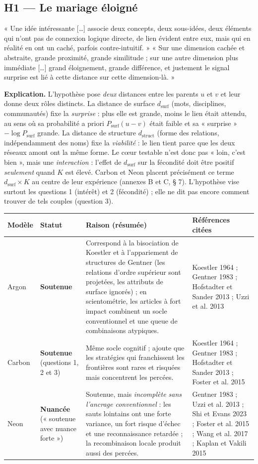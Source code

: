 \documentclass[a4paper,11pt]{article}
\makeatletter
\newenvironment{avis}{\small\renewcommand{\arraystretch}{1.15}%
\begin{longtable}{@{}>{\raggedright\arraybackslash}p{1.35cm}>{\raggedright\arraybackslash}p{2.45cm}>{\raggedright\arraybackslash}p{7.15cm}>{\raggedright\arraybackslash}p{4.4cm}@{}}
\toprule \textbf{Modèle} & \textbf{Statut} & \textbf{Raison (résumée)} & \textbf{Références citées}\\ \midrule \endhead
\bottomrule \endfoot}{\end{longtable}}
\newcommand{\st}[1]{\textbf{#1}}
\makeatother
\begin{document}
\subsection{H1 — Le mariage éloigné}
\begin{enonce}
« Une idée intéressante […] associe deux concepts, deux sous-idées, deux éléments qui n'ont pas de connexion logique directe, de lien évident entre eux, mais qui en réalité en ont un caché, parfois contre-intuitif. » « Sur une dimension cachée et abstraite, grande proximité, grande similitude ; sur une autre dimension plus immédiate […] grand éloignement, grande différence, et justement le signal surprise est lié à cette distance sur cette dimension-là. »
\end{enonce}

\textbf{Explication.} L'hypothèse pose \emph{deux} distances entre les parents $u$ et $v$ et leur donne deux rôles distincts. La distance de surface $d_{\text{surf}}$ (mots, disciplines, communautés) fixe la \emph{surprise} : plus elle est grande, moins le lien était attendu, au sens où sa probabilité a priori $P_{\text{surf}}(u\!-\!v)$ était faible et sa « surprise » $-\log P_{\text{surf}}$ grande. La distance de structure $d_{\text{struct}}$ (forme des relations, indépendamment des noms) fixe la \emph{viabilité} : le lien tient parce que les deux réseaux amont ont la même forme. Le cœur testable n'est donc pas « loin, c'est bien », mais une \emph{interaction} : l'effet de $d_{\text{surf}}$ sur la fécondité doit être positif \emph{seulement} quand $K$ est élevé. Carbon et Neon placent précisément ce terme $d_{\text{surf}}\times K$ au centre de leur expérience (annexes B et C, § 7). L'hypothèse vise surtout les questions 1 (intérêt) et 2 (fécondité) ; elle ne dit pas encore comment trouver de tels couples (question 3).

\begin{avis}
Argon & \st{Soutenue} & Correspond à la bisociation de Koestler et à l'appariement de structures de Gentner (les relations d'ordre supérieur sont projetées, les attributs de surface ignorés) ; en scientométrie, les articles à fort impact combinent un socle conventionnel et une queue de combinaisons atypiques. & Koestler 1964 ; Gentner 1983 ; Hofstadter et Sander 2013 ; Uzzi et al. 2013\\ \midrule
Carbon & \st{Soutenue} (questions 1, 2 et 3) & Même socle cognitif ; ajoute que les stratégies qui franchissent les frontières sont rares et risquées mais concentrent les percées. & Koestler 1964 ; Gentner 1983 ; Hofstadter et Sander 2013 ; Foster et al. 2015\\ \midrule
Neon & \st{Nuancée} (« soutenue avec nuance forte ») & Soutenue, mais \emph{incomplète sans l'ancrage conventionnel} : les sauts lointains ont une forte variance, un fort risque d'échec et une reconnaissance retardée ; la recombinaison locale produit aussi des percées. & Gentner 1983 ; Uzzi et al. 2013 ; Shi et Evans 2023 ; Foster et al. 2015 ; Wang et al. 2017 ; Kaplan et Vakili 2015\\
\end{avis}
\end{document}
